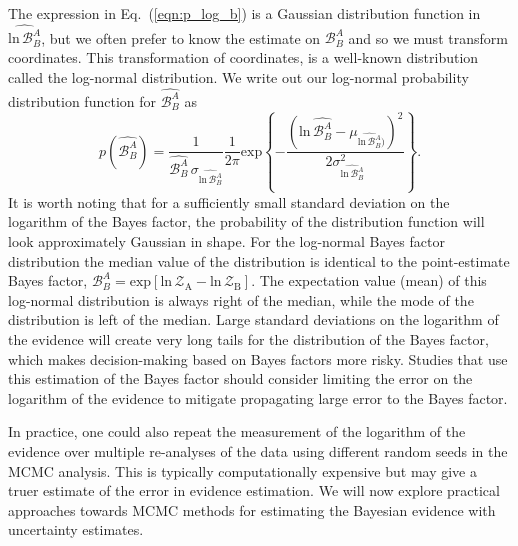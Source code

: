The expression in Eq.~(\ref{eqn:p_log_b}) is a Gaussian distribution function in $\widehat{\mathrm{ln} \, \mathcal{B}^A_B}$, but we often prefer to know the estimate on $\mathcal{B}^A_B$ and so we must transform coordinates. This transformation of coordinates, is a well-known distribution called the log-normal distribution. We write out our log-normal probability distribution function for $\widehat{\mathcal{B}^A_B}$ as
\begin{equation}
    p(\widehat{\mathcal{B}^A_B}) = \frac{1}{\widehat{\mathcal{B}^A_B} \, \sigma_{\widehat{\mathrm{ln} \, \mathcal{B}^A_B}}} \frac{1}{2\pi} \mathrm{exp} \left \{-\frac{\left(\mathrm{ln} \, \widehat{\mathcal{B}^A_B} - \mu_{\widehat{\mathrm{ln} \, \mathcal{B}^A_B})}\right)^2} {2 \sigma^2_{\widehat{\mathrm{ln} \, \mathcal{B}^A_B}}}  \right\}.
\end{equation}
It is worth noting that for a sufficiently small standard deviation on the logarithm of the Bayes factor, the probability of the distribution function will look approximately Gaussian in shape. For the log-normal Bayes factor distribution the median value of the distribution is identical to the point-estimate Bayes factor, $\mathcal{B}^A_B = \mathrm{exp} \left[\mathrm{ln} \, \mathcal{Z}_{\mathrm{A}} - \mathrm{ln} \, \mathcal{Z}_{\mathrm{B}} \right]$. The expectation value (mean) of this log-normal distribution is always right of the median, while the mode of the distribution is left of the median. Large standard deviations on the logarithm of the evidence will create very long tails for the distribution of the Bayes factor, which makes decision-making based on Bayes factors more risky. Studies that use this estimation of the Bayes factor should consider limiting the error on the logarithm of the evidence to mitigate propagating large error to the Bayes factor.

In practice, one could also repeat the measurement of the logarithm of the evidence over multiple re-analyses of the data using different random seeds in the MCMC analysis. This is typically computationally expensive but may give a truer estimate of the error in evidence estimation. We will now explore practical approaches towards MCMC methods for estimating the Bayesian evidence with uncertainty estimates.

